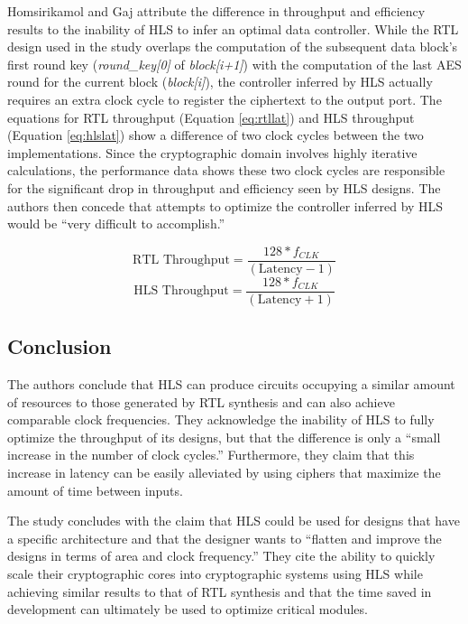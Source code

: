 \documentclass[12pt,journal,compsoc,onecolumn]{IEEEtran}
\begin{document}
Homsirikamol and Gaj attribute the difference in throughput and efficiency results to the inability of HLS to infer an optimal data controller. While the RTL design used in the study overlaps the computation of the subsequent data block's first round key (\emph{round\_key[0]} of \emph{block[i+1]}) with the computation of the last AES round for the current block (\emph{block[i]}), the controller inferred by HLS actually requires an extra clock cycle to register the ciphertext to the output port. The equations for RTL throughput (Equation \ref{eq:rtllat}) and HLS throughput (Equation \ref{eq:hlslat}) show a difference of two clock cycles between the two implementations. Since the cryptographic domain involves highly iterative calculations, the performance data shows these two clock cycles are responsible for the significant drop in throughput and efficiency seen by HLS designs. The authors then concede that attempts to optimize the controller inferred by HLS would be ``very difficult to accomplish.''

\begin{equation}\label{eq:rtllat}
	\text{RTL Throughput}=\frac{128*f_{CLK}}{(\text{Latency}-1)}
\end{equation}
\begin{equation}\label{eq:hlslat}
	\text{HLS Throughput}=\frac{128*f_{CLK}}{(\text{Latency}+1)}
\end{equation}

\subsection{Conclusion}

The authors conclude that HLS can produce circuits occupying a similar amount of resources to those generated by RTL synthesis and can also achieve comparable clock frequencies. They acknowledge the inability of HLS to fully optimize the throughput of its designs, but that the difference is only a ``small increase in the number of clock cycles.'' Furthermore, they claim that this increase in latency can be easily alleviated by using ciphers that maximize the amount of time between inputs.

The study concludes with the claim that HLS could be used for designs that have a specific architecture and that the designer wants to ``flatten and improve the designs in terms of area and clock frequency.'' They cite the ability to quickly scale their cryptographic cores into cryptographic systems using HLS while achieving similar results to that of RTL synthesis and that the time saved in development can ultimately be used to optimize critical modules.
\end{document}
